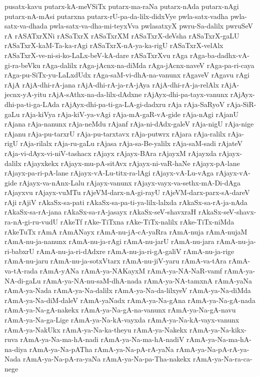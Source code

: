 {pusatx-kavu
putarx-kA-meVSiTx
putarx-ma-raNa
putarx-nAda
putarx-nAgi
putarx-nA-mAsi
putarxna
putarx-rU-pa-da-lilx-didxVye
pwla-satx-vadha
pwla-satx-va-dhada
pwla-satx-va-dha-mi-teyxVva
pwlasatxyX
pwru-Sa-dalilx
pwruSeV
rA
rASATxrXNi
rASaTxrX
rASaTxrXM
rASaTxrX-deVsha
rASaTxrX-gaLU
rASaTxrX-kaM-Ta-ka-rAgi
rASaTxrX-nA-ya-ka-rigU
rASaTxrX-velAlx
rASaTxrX-ve-ni-si-ko-LaLx-beV-kA-dare
rASaTxrXvu
rAga
rAga-ba-dadhx-vA-gi-ra-beVku
rAga-dalilx
rAga-jAcnx-na-diMda
rAga-jAcnx-naveV
rAga-pa-ri-caya
rAga-pu-SiTx-yu-LaLxdUdx
rAga-saM-vi-dhA-na-vanunx
rAgaveV
rAgavu
rAgi
rAjA
rAjA-dhi-rA-jana
rAjA-dhi-rA-ja-rA-jAya
rAjA-dhi-rA-ja-relAlx
rAjA-jecnx-yA-yitu
rAjA-sAthx-na-da-lilx-dAdxne
rAjAyx-dhi-pa-tayx-vanunx
rAjAyx-dhi-pa-ti-ga-LAda
rAjAyx-dhi-pa-ti-ga-LA-gi-dadxru
rAja
rAja-SaRyoV
rAja-SiR-gaLu
rAja-kiVya
rAja-kiV-ya-vAgi
rAja-mA-gaR-vA-gide
rAja-nAgi
rAjanU
rAjana
rAja-nanunx
rAja-neMdu
rAjanf
rAja-ni-dAdx-galeV
rAja-nigU
rAja-nige
rAjanu
rAja-pu-tarxrU
rAja-pu-tarxtavx
rAja-putwrx
rAjara
rAja-ralilx
rAja-rigU
rAja-rilalx
rAja-ru-gaLu
rAjasa
rAja-sa-Be-yalilx
rAja-saM-sadi
rAjateV
rAja-vi-dAyx-vi-niV-tashacx
rAjayx
rAjayx-BAra
rAjayxM
rAjayxda
rAjayx-dalilx
rAjayxkekx
rAjayx-mu-pA-sitAvx
rAjayx-ni-vaR-haNe
rAjayx-pA-lane
rAjayx-pa-ri-pA-lane
rAjayx-vA-Lu-titx-ra-lAgi
rAjayx-vA-Lu-vAga
rAjayx-vA-gide
rAjayx-va-nAnx-Lalu
rAjayx-vanunx
rAjayx-vayx-va-sethx-mA-Di-dAga
rAjayxvu
rAjayx-vuMTu
rAjeVM-darx-nA-gi-rayU
rAjeVM-darx-parx-sA-dareV
rAji
rAjiV
rAkaSx-sa-pati
rAkaSx-sa-pa-ti-ya-lilx-lalxda
rAkaSx-sa-rA-ja-nAda
rAkaSx-sa-rA-jana
rAkaSx-sa-rA-jasayx
rAkaSx-seV-shavxraH
rAkaSx-seV-shavx-ra-nA-gi-ru-vudU
rAkeTf
rAke-TiTxna
rAke-TiTx-nalilx
rAke-TiTx-niMda
rAkeTuTx
rAmA
rAmANayx
rAmA-nu-jA-cA-yaRra
rAmA-nuja
rAmA-nujaM
rAmA-nu-ja-nanunx
rAmA-nu-ja-rAgi
rAmA-nu-jarU
rAmA-nu-jara
rAmA-nu-ja-ri-babxrU
rAmA-nu-ja-ri-dAdxre
rAmA-nu-ja-ri-gA-galiV
rAmA-nu-ja-rige
rAmA-nu-jaru
rAmA-nu-ja-sotxVtarx
rAmA-nu-jiV-yaru
rAmA-va-tAra
rAmA-va-tA-rada
rAmA-yANa
rAmA-ya-NAKayxM
rAmA-ya-NA-NaR-vamf
rAmA-ya-NA-di-gaLu
rAmA-ya-NA-nu-saM-dhA-nada
rAmA-ya-NA-tamxnA
rAmA-yaNa
rAmA-ya-Nada
rAmA-ya-Na-dalilx
rAmA-ya-Na-da-lilxyeV
rAmA-ya-Na-diMda
rAmA-ya-Na-diM-daleV
rAmA-yaNadx
rAmA-ya-Na-gAna
rAmA-ya-Na-gA-nada
rAmA-ya-Na-gA-nakekx
rAmA-ya-Na-gA-na-vanunx
rAmA-ya-Na-gA-navu
rAmA-ya-Na-ga-Lige
rAmA-ya-Na-kA-vayxda
rAmA-ya-Na-kA-vayx-vanunx
rAmA-ya-NakUkx
rAmA-ya-Na-ka-theyu
rAmA-ya-Nakekx
rAmA-ya-Na-kikx-ruva
rAmA-ya-Na-ma-hA-nadi
rAmA-ya-Na-ma-hA-nadiV
rAmA-ya-Na-ma-hA-na-diya
rAmA-ya-Na-pATha
rAmA-ya-Na-pA-rA-yaNa
rAmA-ya-Na-pA-rA-ya-Nada
rAmA-ya-Na-pA-ra-yaNa
rAmA-ya-Na-pa-Tha-nakekx
rAmA-ya-Na-ra-ca-nege
}
